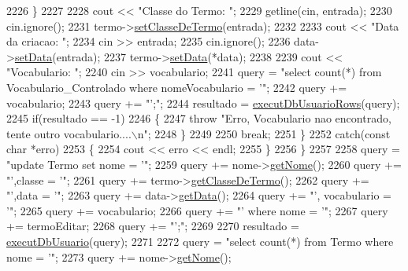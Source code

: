 \begin{DoxyCode}
2226         \}
2227 
2228         cout << \textcolor{stringliteral}{"Classe do Termo: "};
2229         getline(cin, entrada);
2230         cin.ignore();
2231         termo->\mbox{\hyperlink{class_termo_a8c32e501b39e008ea369650e3eb196b1}{setClasseDeTermo}}(entrada);
2232 
2233         cout << \textcolor{stringliteral}{"Data da criacao: "};
2234         cin >> entrada;
2235         cin.ignore();
2236         data->\mbox{\hyperlink{class_data_a5245638838a033c98a8b760836dddb7d}{setData}}(entrada);
2237         termo->\mbox{\hyperlink{class_termo_abf829a90ed067a580bb9d4c90db0f160}{setData}}(*data);
2238 
2239         cout << \textcolor{stringliteral}{"Vocabulario: "};
2240         cin >> vocabulario;
2241         query = \textcolor{stringliteral}{"select count(*) from Vocabulario\_Controlado where nomeVocabulario = '"};
2242         query += vocabulario;
2243         query += \textcolor{stringliteral}{"';"};
2244         resultado = \mbox{\hyperlink{comando_sql_8cpp_af54952694f2fa7d76f969fb74b853cb9}{executDbUsuarioRows}}(query);
2245         \textcolor{keywordflow}{if}(resultado == -1)
2246         \{
2247           \textcolor{keywordflow}{throw} \textcolor{stringliteral}{"Erro, Vocabulario nao encontrado, tente outro vocabulario....\(\backslash\)n"};
2248         \}
2249 
2250         \textcolor{keywordflow}{break};
2251       \}
2252       \textcolor{keywordflow}{catch}(\textcolor{keyword}{const} \textcolor{keywordtype}{char} *erro)
2253       \{
2254         cout << erro << endl;
2255       \}
2256     \}
2257 
2258       query = \textcolor{stringliteral}{"update Termo set nome = '"};
2259       query += nome->\mbox{\hyperlink{class_nome_aad41176173eec20cbbae1576447a3697}{getNome}}();
2260       query += \textcolor{stringliteral}{"',classe = '"};
2261       query += termo->\mbox{\hyperlink{class_termo_ae7e8fb47c8e03506b98a952fa25aa97b}{getClasseDeTermo}}();
2262       query += \textcolor{stringliteral}{"',data = '"};
2263       query += data->\mbox{\hyperlink{class_data_afc7b15a5e81334858e48709b2f45cdc3}{getData}}();
2264       query += \textcolor{stringliteral}{"', vocabulario = '"};
2265       query += vocabulario;
2266       query += \textcolor{stringliteral}{"' where nome = '"};
2267       query += termoEditar;
2268       query += \textcolor{stringliteral}{"';"};
2269 
2270       resultado = \mbox{\hyperlink{comando_sql_8cpp_a748197580e7f9acdbf48c78de1f7924b}{executDbUsuario}}(query);
2271 
2272       query = \textcolor{stringliteral}{"select count(*) from Termo where nome = '"};
2273       query += nome->\mbox{\hyperlink{class_nome_aad41176173eec20cbbae1576447a3697}{getNome}}();

\end{DoxyCode}
